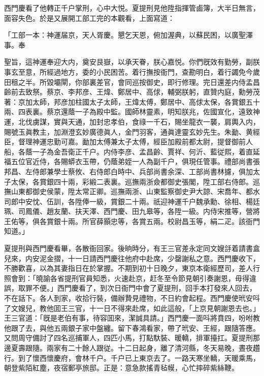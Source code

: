 西門慶看了他轉正千户掌刑，心中大悦。夏提刑見他陞指揮管鹵簿，大半日無言，面容失色。於是又展開工部工完的本觀看，上面寫道：

\begin{myquote}[\markfont]
「工部一本：神運届京，天人胥慶。懇乞天恩，俯加渥典，以蘇民困，以廣聖澤事。奉

聖旨，這神運奉迎大内，奠安艮嶽，以承天眷，朕心嘉悦。你們旣效有勤勞，副朕事玄至意，所經過地方，委的小民困苦。着行撫按衙門，查勘明白，着行蠲免今歲田租之半。所毀壩閘，你部裏差官，會同巡按御史，即行修理。完日還差内侍孟昌齡前去致祭。蔡京、李邦彦、王煒、鄭居中、高俅，輔弼朕躬，直贊内庭，勳勞茂著：京加太師，邦彦加柱國太子太師，王煒太傅，鄭居中、高俅太保，各賞銀五十兩、四表裏。蔡京還蔭一子為殿中監。國師林靈素，明知朕兆，佐國宣化，遠致神運，北伐虜謀，實與天通，加封忠孝伯，食祿一千石，賜坐龍衣一襲，肩輿入内，賜號玉眞教主，加淵澄玄妙廣德眞人，金門羽客，通眞達靈玄妙先生。朱勔、黄經臣，督理神運忠勤可嘉。勔加太傅兼太子太傅，經臣加殿前都太尉，提督御前人船，各蔭一子為金吾衛正千户。内侍李彦、孟昌齡、賈祥、何沂、藍従熙，着直延福五位官近侍，各賜蟒衣玉帶，仍蔭弟姪一人為副千户，俱現任管事。禮部尚書張邦昌、左侍郎兼學士蔡攸、右侍郎白時中、兵部尚書余深、工部尚書林攄，俱加太子太保，各賞銀四十兩，彩緞二表裏。巡撫兩浙僉都御史張閣，陞工部右侍郎。巡撫山東都御史侯蒙，陞太常正卿。巡撫兩浙、山東監察御史尹大諒、宋喬年、都水司郎中安忱、伍訓，各陞俸一級，賞銀二十兩。祇迎神運千户魏承勳、徐相、楊廷珮、司鳳儀、趙友蘭、扶天澤、西門慶、田九皋等，各陞一級。内侍宋推等，營將王佑等，俱各賞銀十兩。所官薛顥忠等，各賞五兩。校尉昌玉等，絹二疋。該衙門知道。」
\end{myquote}

夏提刑與西門慶看畢，各散衙回家。後晌時分，有王三官差永定同文嫂㧱着請書盒兒來，内安泥金摺，十一日請西門慶往他府中赴席，少罄謝私之意。西門慶收下，不勝歡喜，以為其妻指日在於掌握。不期到初十日晚夕，東京本衛經歷司，差人行照會到：「曉諭各省提刑官員知悉，火速赴京，赶冬至令節見朝引奏謝恩，毋得違誤，取罪不便。」西門慶看了，到次日衙門中會了夏提刑，回手本打發來人回去，不在話下。各人到家，收拾行裝，備辦贄見禮物，不日約會起程。西門慶使玳安呌了文嫂兒，教他囬王三官，十一日不得來赴席，如此這般，「上京見朝謝恩去也。」王三官道：「旣是老伯有事，待容囬來，潔誠具請。」西門慶一面呌將賁四，吩咐教他跟了去，與他五兩銀子家中盤纏。留下春鴻看家，帶了玳安、王經，跟隨答應。又問周守備討了四名巡捕軍人，四匹小馬，打點馱裝、暖轎，排軍擡扛。夏提刑那邊夏壽跟隨。兩家有二十餘人跟従。十二日起身，離了清河縣，冬天易晚，晝夜趲行。到了懷西懷慶府，會林千户。千户已上東京去了。一路天寒坐轎，天暖乘馬，朝登紫陌紅塵，夜宿郵亭旅邸。正是：意急款搖青毡幙，心忙摔碎紫絲鞭。

